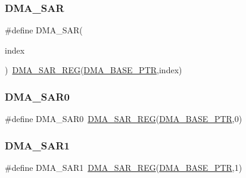 \subsubsection{\texorpdfstring{D\+M\+A\+\_\+\+S\+AR}{DMA\_SAR}}
{\footnotesize\ttfamily \#define D\+M\+A\+\_\+\+S\+AR(\begin{DoxyParamCaption}\item[{}]{index }\end{DoxyParamCaption})~\hyperlink{group___d_m_a___register___accessor___macros_ga5e8089b8febb548b3b294eefc5ec71d1}{D\+M\+A\+\_\+\+S\+A\+R\+\_\+\+R\+EG}(\hyperlink{group___d_m_a___peripheral_ga6997fbc1b1973e9f27170217a3bd6f22}{D\+M\+A\+\_\+\+B\+A\+S\+E\+\_\+\+P\+TR},index)}

\mbox{\label{group___d_m_a___register___accessor___macros_ga6f8523733d96c977bb1be7b229f6f31e}} 
\subsubsection{\texorpdfstring{D\+M\+A\+\_\+\+S\+A\+R0}{DMA\_SAR0}}
{\footnotesize\ttfamily \#define D\+M\+A\+\_\+\+S\+A\+R0~\hyperlink{group___d_m_a___register___accessor___macros_ga5e8089b8febb548b3b294eefc5ec71d1}{D\+M\+A\+\_\+\+S\+A\+R\+\_\+\+R\+EG}(\hyperlink{group___d_m_a___peripheral_ga6997fbc1b1973e9f27170217a3bd6f22}{D\+M\+A\+\_\+\+B\+A\+S\+E\+\_\+\+P\+TR},0)}

\mbox{\label{group___d_m_a___register___accessor___macros_gab629805f8468a977ef2180800b1b5d80}} 
\subsubsection{\texorpdfstring{D\+M\+A\+\_\+\+S\+A\+R1}{DMA\_SAR1}}
{\footnotesize\ttfamily \#define D\+M\+A\+\_\+\+S\+A\+R1~\hyperlink{group___d_m_a___register___accessor___macros_ga5e8089b8febb548b3b294eefc5ec71d1}{D\+M\+A\+\_\+\+S\+A\+R\+\_\+\+R\+EG}(\hyperlink{group___d_m_a___peripheral_ga6997fbc1b1973e9f27170217a3bd6f22}{D\+M\+A\+\_\+\+B\+A\+S\+E\+\_\+\+P\+TR},1)}

